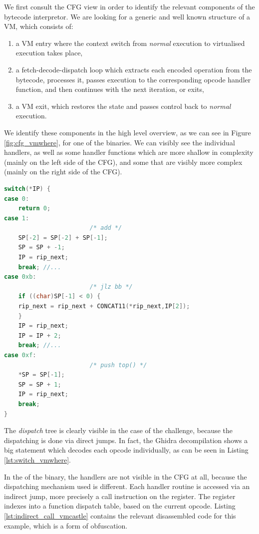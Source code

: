 We first consult the \gls{CFG} view in order to identify the relevant components of the bytecode interpretor. We are looking for a generic and well known structure of a \gls{VM}, which consists of: 
\begin{enumerate}
    \item a \gls{VM} entry where the context switch from \emph{normal} execution to virtualised execution takes place,
    \item  a fetch-decode-dispatch loop which extracts each encoded operation from the bytecode, processes it, passes execution to the corresponding opcode handler function, and then continues with the next iteration, or exits,
    \item a \gls{VM} exit, which restores the state and passes control back to \emph{normal} execution.
\end{enumerate}

   We identify these components in the high level overview, as we can see in Figure \ref{fig:cfg_vmwhere}, for one of the binaries. We can visibly see the individual handlers, as well as some handler functions which are more shallow in complexity (mainly on the left side of the \gls{CFG}), and some that are visibly more complex  (mainly on the right side of the \gls{CFG}). 

\begin{lstlisting}[language=c, label={lst:switch_vmwhere}, caption={Decompilation section of the \cc{vmwhere} dispatcher, after variable renaming and retyping. We notice the implementation of the \cc{add}, \cc{jlz} and \cc{push_top} instructions.}]
switch(*IP) {
case 0:
    return 0;
case 1:
                        /* add */
    SP[-2] = SP[-2] + SP[-1];
    SP = SP + -1;
    IP = rip_next;
    break; //...
case 0xb:
                        /* jlz bb */
    if ((char)SP[-1] < 0) {
    rip_next = rip_next + CONCAT11(*rip_next,IP[2]);
    }
    IP = rip_next;
    IP = IP + 2;
    break; //...
case 0xf:
                        /* push top() */
    *SP = SP[-1];
    SP = SP + 1;
    IP = rip_next;
    break;
}
\end{lstlisting}

The \emph{dispatch} tree is clearly visible in the case of the  challenge, because the dispatching is done via direct jumps. In fact, the Ghidra decompilation shows a big  statement which decodes each opcode individually, as can be seen in Listing \ref{lst:switch_vmwhere}. 

In the of the  binary, the handlers are not visible in the \gls{CFG} at all, because the dispatching mechanism used is different. Each handler routine is accessed via an indirect jump, more precisely a call instruction on the  register. The  register indexes into a function dispatch table, based on the current opcode. Listing \ref{lst:indirect_call_vmcastle} contains the relevant disassembled code for this example, which is a form of obfuscation.

